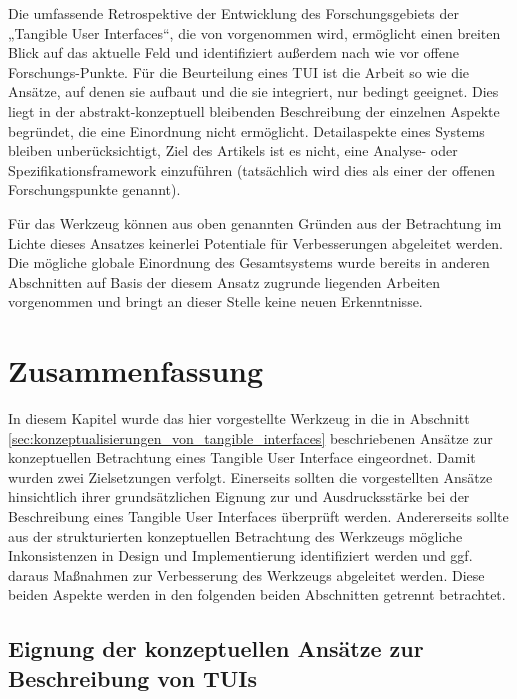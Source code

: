 Die umfassende Retrospektive der Entwicklung des Forschungsgebiets der „Tangible User Interfaces“, die von \citep{Ishii08} vorgenommen wird, ermöglicht einen breiten Blick auf das aktuelle Feld und identifiziert außerdem nach wie vor offene Forschungs-Punkte. Für die Beurteilung eines \gls{TUI} ist die Arbeit so wie die Ansätze, auf denen sie aufbaut und die sie integriert, nur bedingt geeignet. Dies liegt in der abstrakt-konzeptuell bleibenden Beschreibung der einzelnen Aspekte begründet, die eine Einordnung nicht ermöglicht. Detailaspekte eines Systems bleiben unberücksichtigt, Ziel des Artikels ist es nicht, eine Analyse- oder Spezifikationsframework einzuführen (tatsächlich wird dies als einer der offenen Forschungspunkte genannt).

Für das Werkzeug können aus oben genannten Gründen aus der Betrachtung im Lichte dieses Ansatzes keinerlei Potentiale für 
Verbesserungen abgeleitet werden. Die mögliche globale Einordnung des Gesamtsystems wurde bereits in anderen Abschnitten auf Basis der diesem Ansatz zugrunde liegenden Arbeiten vorgenommen und bringt an dieser Stelle keine neuen Erkenntnisse.


\section{Zusammenfassung} %
\label{sec:konz_eval_zusammenfassung}

In diesem Kapitel wurde das hier vorgestellte Werkzeug in die in Abschnitt \ref{sec:konzeptualisierungen_von_tangible_interfaces} beschriebenen Ansätze zur konzeptuellen Betrachtung eines Tangible User Interface eingeordnet. Damit wurden zwei Zielsetzungen verfolgt. Einerseits sollten die vorgestellten Ansätze hinsichtlich ihrer grundsätzlichen Eignung zur und Ausdrucksstärke bei der Beschreibung eines Tangible User Interfaces überprüft werden. Andererseits sollte aus der strukturierten konzeptuellen Betrachtung des Werkzeugs mögliche Inkonsistenzen in Design und Implementierung identifiziert werden und ggf. daraus Maßnahmen zur Verbesserung des Werkzeugs abgeleitet werden. Diese beiden Aspekte werden in den folgenden beiden Abschnitten getrennt betrachtet.

\subsection{Eignung der konzeptuellen Ansätze zur Beschreibung von TUIs} %
\label{sub:eignung_der_konzeptuellen_ansätze}

